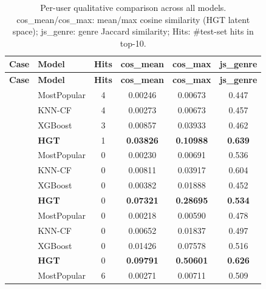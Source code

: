 \setlength{\tabcolsep}{4pt}
\renewcommand{\arraystretch}{1.15}
\begin{longtable}{llcccc}
\caption{Per-user qualitative comparison across all models. cos\_mean/cos\_max: mean/max cosine similarity (HGT latent space); js\_genre: genre Jaccard similarity; Hits: \#test-set hits in top-10.}
\label{tab:qualitative_cos}\\
\toprule
\textbf{Case} & \textbf{Model} & \textbf{Hits} & \textbf{cos\_mean} & \textbf{cos\_max} & \textbf{js\_genre}\\
\midrule
\endfirsthead
\toprule
\textbf{Case} & \textbf{Model} & \textbf{Hits} & \textbf{cos\_mean} & \textbf{cos\_max} & \textbf{js\_genre}\\
\midrule
\endhead
\bottomrule
\endfoot
{}
  & MostPopular   & 4 & 0.00246 & 0.00673 & 0.447\\
  & KNN-CF        & 4 & 0.00273 & 0.00673 & 0.457\\
  & XGBoost       & 3 & 0.00857 & 0.03933 & 0.462\\
  & \textbf{HGT}  & 1 & \textbf{0.03826} & \textbf{0.10988} & \textbf{0.639}\\
\midrule
{}
  & MostPopular   & 0 & 0.00230 & 0.00691 & 0.536\\
  & KNN-CF        & 0 & 0.00811 & 0.03917 & 0.604\\
  & XGBoost       & 0 & 0.00382 & 0.01888 & 0.452\\
  & \textbf{HGT}  & 0 & \textbf{0.07321} & \textbf{0.28695} & \textbf{0.534}\\
\midrule
{}
  & MostPopular   & 0 & 0.00218 & 0.00590 & 0.478\\
  & KNN-CF        & 0 & 0.00652 & 0.01837 & 0.497\\
  & XGBoost       & 0 & 0.01426 & 0.07578 & 0.516\\
  & \textbf{HGT}  & 0 & \textbf{0.09791} & \textbf{0.50601} & \textbf{0.626}\\
\midrule
{}
  & MostPopular   & 6 & 0.00271 & 0.00711 & 0.509\\

\end{longtable}
